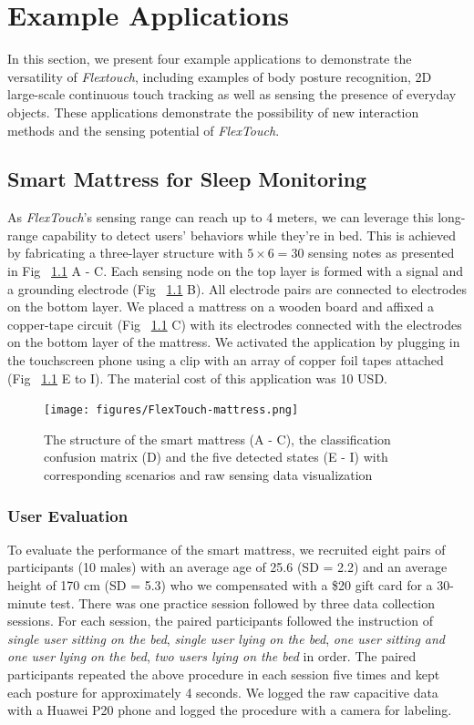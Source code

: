 \chapter{Example Applications}
In this section, we present four example applications to demonstrate the versatility of \textit{Flextouch}, including examples of body posture recognition, 2D large-scale continuous touch tracking as well as sensing the presence of everyday objects. These applications demonstrate the possibility of new interaction methods and the sensing potential of \emph{FlexTouch}.

\section{Smart Mattress for Sleep Monitoring}
As \textit{FlexTouch}'s sensing range can reach up to 4 meters, we can leverage this long-range capability to detect users' behaviors while they're in bed. This is achieved by fabricating a three-layer structure with $5 \times 6 = 30$ sensing notes as presented in Fig ~\ref{fig:smartmattress} A - C. Each sensing node on the top layer is formed with a signal and a grounding electrode (Fig ~\ref{fig:smartmattress} B). All electrode pairs are connected to electrodes on the bottom layer. We placed a mattress on a wooden board and affixed a copper-tape circuit (Fig ~\ref{fig:smartmattress} C) with its electrodes connected with the electrodes on the bottom layer of the mattress. We activated the application by plugging in the touchscreen phone using a clip with an array of copper foil tapes attached (Fig ~\ref{fig:smartmattress} E to I). The material cost of this application was 10 USD.

\begin{figure}[ht]
  \centering
    \texttt{[image: figures/FlexTouch-mattress.png]}
    \setlength{\belowcaptionskip}{-6pt}
    \caption{The structure of the smart mattress (A - C), the classification confusion matrix (D)  and the five detected states (E - I) with corresponding scenarios and raw sensing data visualization}
    \label{fig:smartmattress}
  \end{figure}

\subsection{User Evaluation}
To evaluate the performance of the smart mattress, we recruited eight pairs of participants (10 males) with an average age of 25.6 (SD = 2.2) and an average height of 170 cm (SD = 5.3) who we compensated with a \$20 gift card for a 30-minute test. There was one practice session followed by three data collection sessions. For each session, the paired participants followed the instruction of \textit{single user sitting on the bed}, \textit{single user lying on the bed}, \textit{one user sitting and one user lying on the bed}, \textit{two users lying on the bed} in order. The paired participants repeated the above procedure in each session five times and kept each posture for approximately 4 seconds. We logged the raw capacitive data with a Huawei P20 phone and logged the procedure with a camera for labeling. 


